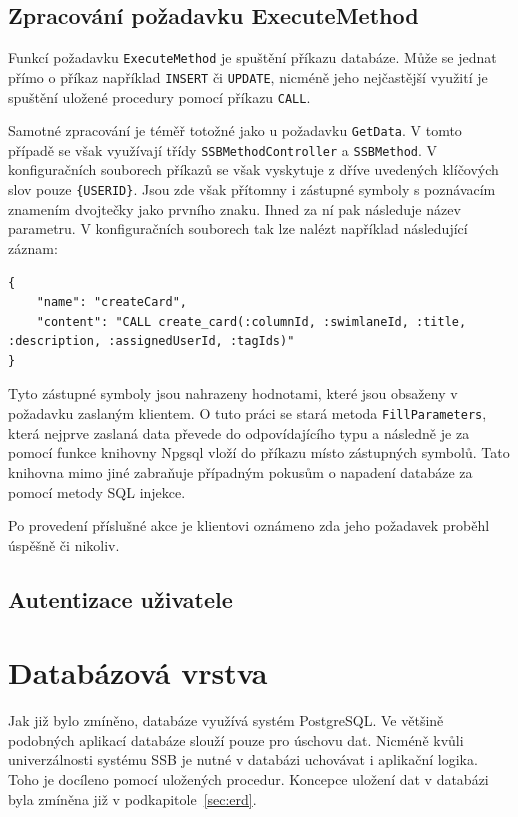 \subsection{Zpracování požadavku ExecuteMethod}
Funkcí požadavku \texttt{ExecuteMethod} je spuštění příkazu databáze. Může se jednat přímo o příkaz například \texttt{INSERT} či \texttt{UPDATE}, nicméně jeho nejčastější využití je spuštění uložené procedury pomocí příkazu \texttt{CALL}.

Samotné zpracování je téměř totožné jako u požadavku \texttt{GetData}. V tomto případě se však využívají třídy \texttt{SSBMethodController} a \texttt{SSBMethod}. V konfiguračních souborech příkazů se však vyskytuje z dříve uvedených klíčových slov pouze \texttt{\{USERID\}}. Jsou zde však přítomny i zástupné symboly s poznávacím znamením dvojtečky jako prvního znaku. Ihned za ní pak následuje název parametru. V konfiguračních souborech tak lze nalézt například následující záznam:

\begin{verbatim}
{
    "name": "createCard",
    "content": "CALL create_card(:columnId, :swimlaneId, :title, :description, :assignedUserId, :tagIds)"
}
\end{verbatim}

Tyto zástupné symboly jsou nahrazeny hodnotami, které jsou obsaženy v požadavku zaslaným klientem. O tuto práci se stará metoda \texttt{FillParameters}, která nejprve zaslaná data převede do odpovídajícího typu a následně je za pomocí funkce knihovny Npgsql vloží do příkazu místo zástupných symbolů. Tato knihovna mimo jiné zabraňuje případným pokusům o napadení databáze za pomocí metody SQL injekce. 

Po provedení příslušné akce je klientovi oznámeno zda jeho požadavek proběhl úspěšně či nikoliv.

\subsection{Autentizace uživatele}
\blindtext



\section{Databázová vrstva}
Jak již bylo zmíněno, databáze využívá systém PostgreSQL. Ve většině podobných aplikací databáze slouží pouze pro úschovu dat. Nicméně kvůli univerzálnosti systému SSB je nutné v databázi uchovávat i aplikační logika. Toho je docíleno pomocí uložených procedur. Koncepce uložení dat v databázi byla zmíněna již v podkapitole~\ref{sec:erd}.

